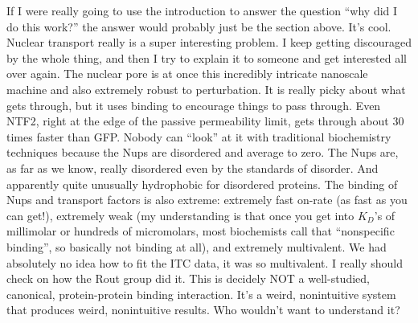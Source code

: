 {If I were really going to use the introduction to answer the question ``why did I do this work?'' the answer would probably just be the section above.  It's cool.  Nuclear transport really is a super interesting problem.  I keep getting discouraged by the whole thing, and then I try to explain it to someone and get interested all over again.  The nuclear pore is at once this incredibly intricate nanoscale machine and also extremely robust to perturbation.  It is really picky about what gets through, but it uses binding to encourage things to pass through.  Even NTF2, right at the edge of the passive permeability limit, gets through about 30 times faster than GFP.  Nobody can ``look'' at it with traditional biochemistry techniques because the Nups are disordered and average to zero.  The Nups are, as far as we know, really disordered even by the standards of disorder.  And apparently quite unusually hydrophobic for disordered proteins.  The binding of Nups and transport factors is also extreme: extremely fast on-rate (as fast as you can get!), extremely weak (my understanding is that once you get into $K_D$'s of millimolar or hundreds of micromolars, most biochemists call that ``nonspecific binding'', so basically not binding at all), and extremely multivalent.  We had absolutely no idea how to fit the ITC data, it was so multivalent.  I really should check on how the Rout group did it.  This is decidely NOT a well-studied, canonical, protein-protein binding interaction.  It's a weird, nonintuitive system that produces weird, nonintuitive results.  Who wouldn't want to understand it?

}
